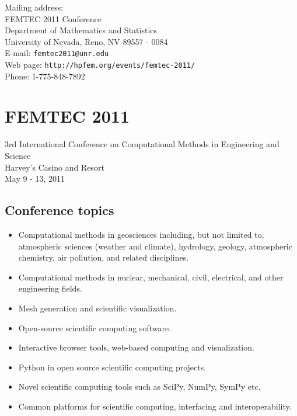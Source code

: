 \documentclass[article,A4,11pt]{llncs}
\begin{document}
Mailing address:\\
FEMTEC 2011 Conference\\
Department of Mathematics and Statistics\\
University of Nevada, Reno, NV 89557 - 0084\\ 

\noindent
E-mail: {\tt femtec2011@unr.edu}\\
Web page: {\tt http://hpfem.org/events/femtec-2011/}\\
Phone: 1-775-848-7892

\chapter*{\huge FEMTEC 2011}
\vspace{-5mm}
\normalsize   
\begin{center}
3rd International Conference on Computational Methods in Engineering and Science\\
Harvey's Casino and Resort\\ 
May 9 - 13, 2011\\
\end{center}
\vspace{-3mm}

\section*{Conference topics}

\begin{itemize}
  \item Computational methods in geosciences including, but not limited to, 
        atmospheric sciences (weather and climate), hydrology, geology, 
        atmospheric chemistry, air pollution, and related disciplines. 
  \item Computational methods in nuclear, mechanical, civil, electrical, and 
        other engineering fields. 
  \item Mesh generation and scientific visualization. 
  \item Open-source scientific computing software.
  \item Interactive browser tools, web-based computing and visualization.
  \item Python in open source scientific computing projects.
  \item Novel scientific computing tools such as SciPy, NumPy, SymPy etc.
  \item Common platforms for scientific computing, interfacing and interoperability.
\end{itemize}
\end{document}
